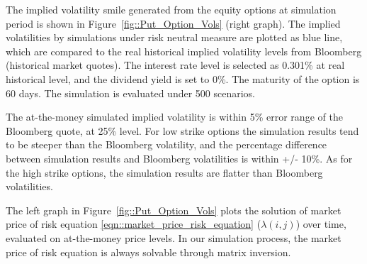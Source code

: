 \documentclass{article}
\begin{document}
The implied volatility smile generated from the equity options at simulation
period is shown in Figure~\ref{fig::Put_Option_Vols} (right graph). The
implied volatilities by simulations under risk neutral measure are plotted
as blue line, which are compared to the real historical implied volatility
levels from Bloomberg (historical market quotes). The interest rate level is
selected as 0.301\% at real historical level, and the dividend yield is set
to 0\%. The maturity of the option is 60 days. The simulation is evaluated
under 500 scenarios.

The at-the-money simulated implied volatility is within 5\% error range of
the Bloomberg quote, at 25\% level. For low strike options the simulation
results tend to be steeper than the Bloomberg volatility, and the percentage
difference between simulation results and Bloomberg volatilities is within
+/- 10\%. As for the high strike options, the simulation results are flatter
than Bloomberg volatilities.

The left graph in Figure~\ref{fig::Put_Option_Vols} plots the solution of
market price of risk equation \ref{eqn::market_price_risk_equation} ($%
\lambda(i,j)$) over time, evaluated on at-the-money price levels. In our
simulation process, the market price of risk equation is always solvable
through matrix inversion.
\end{document}

